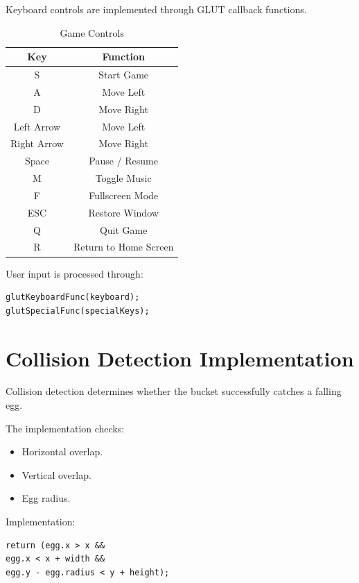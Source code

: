 \documentclass[12pt,a4paper]{report}
\begin{document}
Keyboard controls are implemented through GLUT callback functions.

\begin{table}[h]
\centering
\begin{tabular}{|c|c|}
\hline
\textbf{Key} & \textbf{Function} \\
\hline
S & Start Game \\
\hline
A & Move Left \\
\hline
D & Move Right \\
\hline
Left Arrow & Move Left \\
\hline
Right Arrow & Move Right \\
\hline
Space & Pause / Resume \\
\hline
M & Toggle Music \\
\hline
F & Fullscreen Mode \\
\hline
ESC & Restore Window \\
\hline
Q & Quit Game \\
\hline
R & Return to Home Screen \\
\hline
\end{tabular}
\caption{Game Controls}
\end{table}

User input is processed through:

\begin{verbatim}
glutKeyboardFunc(keyboard);
glutSpecialFunc(specialKeys);
\end{verbatim}

\section{Collision Detection Implementation}

Collision detection determines whether the bucket successfully catches a falling egg.

The implementation checks:

\begin{itemize}
\item Horizontal overlap.
\item Vertical overlap.
\item Egg radius.
\end{itemize}

Implementation:

\begin{verbatim}
return (egg.x > x &&
egg.x < x + width &&
egg.y - egg.radius < y + height);
\end{verbatim}
\end{document}
